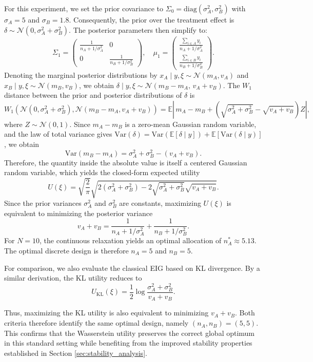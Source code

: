 \documentclass[twoside,11pt]{article}
\begin{document}
For this experiment, we set the prior covariance to $\Sigma_0 = \mathrm{diag}(\sigma_A^2, \sigma_B^2)$ with $\sigma_A = 5$ and $\sigma_B = 1.8$. Consequently, the prior over the treatment effect is $\delta \sim \mathcal{N}(0, \sigma_A^2 + \sigma_B^2)$. The posterior parameters then simplify to:
$$
\Sigma_1 = \begin{pmatrix} \frac{1}{n_A + 1/\sigma_A^2} & 0 \\ 0 & \frac{1}{n_B + 1/\sigma_B^2} \end{pmatrix}, \quad 
\mu_1 = \begin{pmatrix} \frac{\sum_{i \in A} y_i}{n_A + 1/\sigma_A^2} \\ \frac{\sum_{i \in B} y_i}{n_B + 1/\sigma_B^2} \end{pmatrix}.
$$
Denoting the marginal posterior distributions by $x_A \mid y, \xi \sim \mathcal{N}(m_A, v_A)$ and $x_B \mid y, \xi \sim \mathcal{N}(m_B, v_B)$, we obtain $\delta \mid y, \xi \sim \mathcal{N}(m_B - m_A,\, v_A + v_B)$.
The $W_1$ distance between the prior and posterior distributions of $\delta$ is
\[
W_1\!\left(\mathcal{N}(0, \sigma_A^2 + \sigma_B^2), \mathcal{N}(m_B - m_A, v_A + v_B)\right)
=
\mathbb{E}\left|\, m_A - m_B + \left(\sqrt{\sigma_A^2 + \sigma_B^2} - \sqrt{v_A + v_B}\right) Z \right|,
\]
where $Z \sim \mathcal{N}(0,1)$. Since $m_A - m_B$ is a zero-mean Gaussian random variable, and the law of total variance gives $\mathrm{Var}(\delta)
=
\mathrm{Var}(\mathbb{E}[\delta \mid y]) + \mathbb{E}[\mathrm{Var}(\delta \mid y)]$,
we obtain
\[
\mathrm{Var}(m_B - m_A) = \sigma_A^2 + \sigma_B^2 - (v_A + v_B).
\]
Therefore, the quantity inside the absolute value is itself a centered Gaussian random variable, which yields the closed-form expected utility
\[
U(\xi)
=
\sqrt{\frac{2}{\pi}}
\sqrt{
2(\sigma_A^2 + \sigma_B^2)
-
2\sqrt{\sigma_A^2 + \sigma_B^2}\sqrt{v_A + v_B}
}.
\]
Since the prior variances $\sigma_A^2$ and $\sigma_B^2$ are constants, maximizing $U(\xi)$ is equivalent to minimizing the posterior variance
\[
v_A + v_B
=
\frac{1}{n_A + 1/\sigma_A^2}
+
\frac{1}{n_B + 1/\sigma_B^2}.
\]
For $N=10$, the continuous relaxation yields an optimal allocation of $n_A^\ast \approx 5.13$. The optimal discrete design is therefore $n_A = 5$ and $n_B = 5$.

For comparison, we also evaluate the classical EIG based on KL divergence. By a similar derivation, the KL utility reduces to
\[
U_{\mathrm{KL}}(\xi)
=
\frac{1}{2}\log\frac{\sigma_A^2 + \sigma_B^2}{v_A + v_B}.
\]

Thus, maximizing the KL utility is also equivalent to minimizing $v_A + v_B$. Both criteria therefore identify the same optimal design, namely $(n_A, n_B) = (5,5)$. This confirms that the Wasserstein utility preserves the correct global optimum in this standard setting while benefiting from the improved stability properties established in Section \ref{sec:stability_analysis}.
\end{document}
